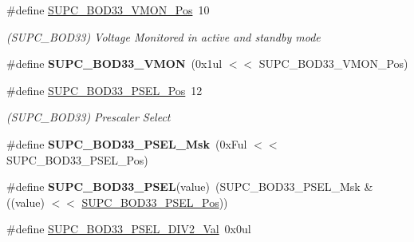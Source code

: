 \begin{DoxyCompactItemize}
\item 
\hypertarget{group___s_a_m_l21___s_u_p_c_gaf180588065015eb76320101640dd44c8}{}\#define \hyperlink{group___s_a_m_l21___s_u_p_c_gaf180588065015eb76320101640dd44c8}{S\+U\+P\+C\+\_\+\+B\+O\+D33\+\_\+\+V\+M\+O\+N\+\_\+\+Pos}~10\label{group___s_a_m_l21___s_u_p_c_gaf180588065015eb76320101640dd44c8}

\begin{DoxyCompactList}\small\item\em (S\+U\+P\+C\+\_\+\+B\+O\+D33) Voltage Monitored in active and standby mode \end{DoxyCompactList}\item 
\hypertarget{group___s_a_m_l21___s_u_p_c_gaaa7fef832064e43807c847d19ae86ca4}{}\#define {\bfseries S\+U\+P\+C\+\_\+\+B\+O\+D33\+\_\+\+V\+M\+O\+N}~(0x1ul $<$$<$ S\+U\+P\+C\+\_\+\+B\+O\+D33\+\_\+\+V\+M\+O\+N\+\_\+\+Pos)\label{group___s_a_m_l21___s_u_p_c_gaaa7fef832064e43807c847d19ae86ca4}

\item 
\hypertarget{group___s_a_m_l21___s_u_p_c_ga749aed0ecd13c1a62c80e107cfe7e31f}{}\#define \hyperlink{group___s_a_m_l21___s_u_p_c_ga749aed0ecd13c1a62c80e107cfe7e31f}{S\+U\+P\+C\+\_\+\+B\+O\+D33\+\_\+\+P\+S\+E\+L\+\_\+\+Pos}~12\label{group___s_a_m_l21___s_u_p_c_ga749aed0ecd13c1a62c80e107cfe7e31f}

\begin{DoxyCompactList}\small\item\em (S\+U\+P\+C\+\_\+\+B\+O\+D33) Prescaler Select \end{DoxyCompactList}\item 
\hypertarget{group___s_a_m_l21___s_u_p_c_ga85b0ac36adc71b04e51d744a805bc082}{}\#define {\bfseries S\+U\+P\+C\+\_\+\+B\+O\+D33\+\_\+\+P\+S\+E\+L\+\_\+\+Msk}~(0x\+Ful $<$$<$ S\+U\+P\+C\+\_\+\+B\+O\+D33\+\_\+\+P\+S\+E\+L\+\_\+\+Pos)\label{group___s_a_m_l21___s_u_p_c_ga85b0ac36adc71b04e51d744a805bc082}

\item 
\hypertarget{group___s_a_m_l21___s_u_p_c_ga511239a65316a3f195a9dc419e9eff3d}{}\#define {\bfseries S\+U\+P\+C\+\_\+\+B\+O\+D33\+\_\+\+P\+S\+E\+L}(value)~(S\+U\+P\+C\+\_\+\+B\+O\+D33\+\_\+\+P\+S\+E\+L\+\_\+\+Msk \& ((value) $<$$<$ \hyperlink{group___s_a_m_l21___s_u_p_c_ga749aed0ecd13c1a62c80e107cfe7e31f}{S\+U\+P\+C\+\_\+\+B\+O\+D33\+\_\+\+P\+S\+E\+L\+\_\+\+Pos}))\label{group___s_a_m_l21___s_u_p_c_ga511239a65316a3f195a9dc419e9eff3d}

\item 
\hypertarget{group___s_a_m_l21___s_u_p_c_ga1985ff1cb7429062883c438da0448c04}{}\#define \hyperlink{group___s_a_m_l21___s_u_p_c_ga1985ff1cb7429062883c438da0448c04}{S\+U\+P\+C\+\_\+\+B\+O\+D33\+\_\+\+P\+S\+E\+L\+\_\+\+D\+I\+V2\+\_\+\+Val}~0x0ul\label{group___s_a_m_l21___s_u_p_c_ga1985ff1cb7429062883c438da0448c04}


\end{DoxyCompactItemize}
